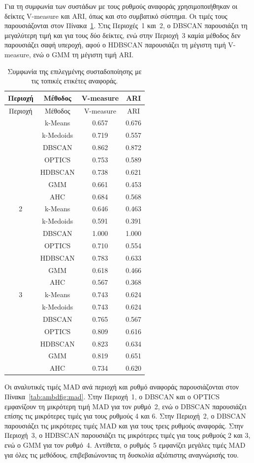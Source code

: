 Για τη συμφωνία των συστάδων με τους ρυθμούς αναφοράς χρησιμοποιήθηκαν οι δείκτες V-measure και ARI, όπως και στο συμβατικό σύστημα. Οι τιμές τους παρουσιάζονται στον Πίνακα~\ref{tab:ambdfig:v-measure_ari}. Στις Περιοχές~1 και~2, ο DBSCAN παρουσιάζει τη μεγαλύτερη τιμή και για τους δύο δείκτες, ενώ στην Περιοχή~3 καμία μέθοδος δεν παρουσιάζει σαφή υπεροχή, αφού ο HDBSCAN παρουσιάζει τη μέγιστη τιμή V-measure, ενώ ο GMM τη μέγιστη τιμή ARI.

\begin{longtable}{cccc}
\caption{Συμφωνία της επιλεγμένης συσταδοποίησης με τις τοπικές ετικέτες αναφοράς.}\label{tab:ambdfig:v-measure_ari}\\
\toprule
Περιοχή & Μέθοδος & V-measure & ARI \\
\midrule
\endfirsthead
\toprule
Περιοχή & Μέθοδος & V-measure & ARI \\
\midrule
\endhead
\endfoot
\bottomrule
\endlastfoot
1 & k-Means & 0.657 & 0.676 \\
& k-Medoids & 0.719 & 0.557 \\
& DBSCAN & 0.862 & 0.872 \\
& OPTICS & 0.753 & 0.589 \\
& HDBSCAN & 0.738 & 0.621 \\
& GMM & 0.661 & 0.453 \\
& AHC & 0.684 & 0.568 \\
\midrule
2 & k-Means & 0.646 & 0.463 \\
& k-Medoids & 0.591 & 0.391 \\
& DBSCAN & 1.000 & 1.000 \\
& OPTICS & 0.710 & 0.554 \\
& HDBSCAN & 0.783 & 0.633 \\
& GMM & 0.618 & 0.466 \\
& AHC & 0.567 & 0.368 \\
\midrule
3 & k-Means & 0.743 & 0.624 \\
& k-Medoids & 0.743 & 0.624 \\
& DBSCAN & 0.765 & 0.567 \\
& OPTICS & 0.809 & 0.616 \\
& HDBSCAN & 0.823 & 0.634 \\
& GMM & 0.819 & 0.651 \\
& AHC & 0.734 & 0.620 \\
\end{longtable}



Οι αναλυτικές τιμές MAD ανά περιοχή και ρυθμό αναφοράς παρουσιάζονται στον Πίνακα~\ref{tab:ambdfig:mad}. Στην Περιοχή~1, ο DBSCAN και ο OPTICS εμφανίζουν τη μικρότερη τιμή MAD για τον ρυθμό~2, ενώ ο DBSCAN παρουσιάζει επίσης τις μικρότερες τιμές για τους ρυθμούς 4 και 6. Στην Περιοχή~2, ο DBSCAN παρουσιάζει τις μικρότερες τιμές MAD και για τους τρεις ρυθμούς αναφοράς. Στην Περιοχή~3, ο HDBSCAN παρουσιάζει τις μικρότερες τιμές για τους ρυθμούς 2 και 3, ενώ ο GMM για τον ρυθμό~4. Αντίθετα, ο ρυθμός~5 εμφανίζει μεγάλες τιμές MAD για όλες τις μεθόδους, επιβεβαιώνοντας τη δυσκολία αξιόπιστης αναγνώρισής του.

